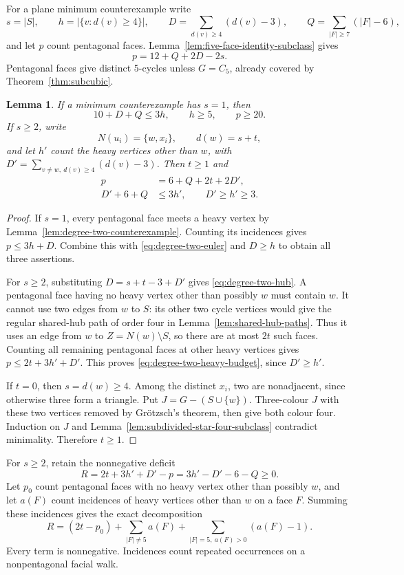 \documentclass[11pt]{article}
\newtheorem{lemma}[theorem]{Lemma}
\theoremstyle{remark}
\numberwithin{equation}{section}
\numberwithin{table}{section}
\begin{document}
For a plane minimum counterexample write
\[
 s=|S|,\qquad h=|\{v:d(v)\ge4\}|,\qquad
 D=\sum_{d(v)\ge4}(d(v)-3),\qquad
 Q=\sum_{|F|\ge7}(|F|-6),
\]
and let $p$ count pentagonal faces. Lemma~\ref{lem:five-face-identity-subclass}
gives
\begin{equation}\label{eq:degree-two-euler}
 p=12+Q+2D-2s.
\end{equation}
Pentagonal faces give distinct $5$-cycles unless $G=C_5$, already covered
by Theorem~\ref{thm:subcubic}.

\begin{lemma}\label{lem:heavy-vertex-budgets}
If a minimum counterexample has $s=1$, then
\[
 10+D+Q\le3h,\qquad h\ge5,\qquad p\ge20.
\]
If $s\ge2$, write
\[
 N(u_i)=\{w,x_i\},\qquad d(w)=s+t,
\]
and let $h'$ count the heavy vertices other than $w$, with
$D'=\sum_{v\ne w,\ d(v)\ge4}(d(v)-3)$. Then $t\ge1$ and
\begin{align}
 p&=6+Q+2t+2D',\label{eq:degree-two-hub}\\
 D'+6+Q&\le3h',\qquad D'\ge h'\ge3.\label{eq:degree-two-heavy-budget}
\end{align}
\end{lemma}
\begin{proof}
If $s=1$, every pentagonal face meets a heavy vertex by
Lemma~\ref{lem:degree-two-counterexample}. Counting its incidences gives
$p\le3h+D$. Combine this with \eqref{eq:degree-two-euler} and $D\ge h$
to obtain all three assertions.

For $s\ge2$, substituting $D=s+t-3+D'$ gives
\eqref{eq:degree-two-hub}. A pentagonal face having no heavy vertex other
than possibly $w$ must contain $w$. It cannot use two edges from $w$ to
$S$: its other two cycle vertices would give the regular shared-hub path
of order four in Lemma~\ref{lem:shared-hub-paths}. Thus it uses an edge
from $w$ to $Z=N(w)\setminus S$, so there are at most $2t$ such faces.
Counting all remaining pentagonal faces at other heavy vertices gives
$p\le2t+3h'+D'$. This proves \eqref{eq:degree-two-heavy-budget}, since
$D'\ge h'$.

If $t=0$, then $s=d(w)\ge4$. Among the distinct $x_i$, two are nonadjacent,
since otherwise three form a triangle. Put $J=G-(S\cup\{w\})$.
Three-colour $J$ with these two vertices removed by Gr\"otzsch's theorem,
then give both colour four. Induction on $J$ and
Lemma~\ref{lem:subdivided-star-four-subclass} contradict minimality.
Therefore $t\ge1$.
\end{proof}

For $s\ge2$, retain the nonnegative deficit
\begin{equation}\label{eq:degree-two-deficit}
 R=2t+3h'+D'-p=3h'-D'-6-Q\ge0.
\end{equation}
Let $p_0$ count pentagonal faces with no heavy vertex other than possibly
$w$, and let $a(F)$ count incidences of heavy vertices other than $w$ on a
face $F$. Summing these incidences gives the exact decomposition
\begin{equation}\label{eq:degree-two-deficit-parts}
 R=(2t-p_0)+\sum_{|F|\ne5}a(F)
       +\sum_{|F|=5,\ a(F)>0}(a(F)-1).
\end{equation}
Every term is nonnegative. Incidences count repeated occurrences on a
nonpentagonal facial walk.
\end{document}
